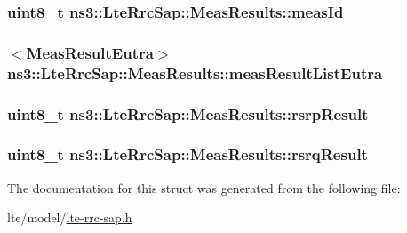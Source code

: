 \subsubsection[{\texorpdfstring{meas\+Id}{measId}}]{\setlength{\rightskip}{0pt plus 5cm}uint8\+\_\+t ns3\+::\+Lte\+Rrc\+Sap\+::\+Meas\+Results\+::meas\+Id}\hypertarget{structns3_1_1LteRrcSap_1_1MeasResults_a1608bbea7e59da137c1b58d3bf55e907}{}\label{structns3_1_1LteRrcSap_1_1MeasResults_a1608bbea7e59da137c1b58d3bf55e907}
\subsubsection[{\texorpdfstring{meas\+Result\+List\+Eutra}{measResultListEutra}}]{$<${\bf Meas\+Result\+Eutra}$>$ ns3\+::\+Lte\+Rrc\+Sap\+::\+Meas\+Results\+::meas\+Result\+List\+Eutra}\hypertarget{structns3_1_1LteRrcSap_1_1MeasResults_a1fc2cdef154508dd522b46c71f854f03}{}\label{structns3_1_1LteRrcSap_1_1MeasResults_a1fc2cdef154508dd522b46c71f854f03}
\subsubsection[{\texorpdfstring{rsrp\+Result}{rsrpResult}}]{\setlength{\rightskip}{0pt plus 5cm}uint8\+\_\+t ns3\+::\+Lte\+Rrc\+Sap\+::\+Meas\+Results\+::rsrp\+Result}\hypertarget{structns3_1_1LteRrcSap_1_1MeasResults_a4d7bf8765525493fe5f5cccdbf94ab8b}{}\label{structns3_1_1LteRrcSap_1_1MeasResults_a4d7bf8765525493fe5f5cccdbf94ab8b}
\subsubsection[{\texorpdfstring{rsrq\+Result}{rsrqResult}}]{\setlength{\rightskip}{0pt plus 5cm}uint8\+\_\+t ns3\+::\+Lte\+Rrc\+Sap\+::\+Meas\+Results\+::rsrq\+Result}\hypertarget{structns3_1_1LteRrcSap_1_1MeasResults_a6a64246cfa5d09eb42120890de3dca32}{}\label{structns3_1_1LteRrcSap_1_1MeasResults_a6a64246cfa5d09eb42120890de3dca32}


The documentation for this struct was generated from the following file\+:\begin{DoxyCompactItemize}
\item 
lte/model/\hyperlink{lte-rrc-sap_8h}{lte-\/rrc-\/sap.\+h}\end{DoxyCompactItemize}
